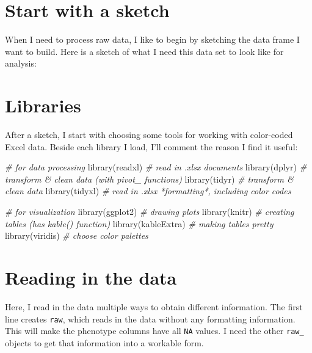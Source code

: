 \documentclass[
]{book}
\newenvironment{Shaded}{\begin{snugshade}}{\end{snugshade}}
\newcommand{\CommentTok}[1]{\textcolor[rgb]{0.56,0.35,0.01}{\textit{#1}}}
\newcommand{\FunctionTok}[1]{\textcolor[rgb]{0.00,0.00,0.00}{#1}}
\newcommand{\NormalTok}[1]{#1}
\begin{document}
\hypertarget{start-with-a-sketch}{%
\section{Start with a sketch}\label{start-with-a-sketch}}

When I need to process raw data, I like to begin by sketching the data frame I want to build. Here is a sketch of what I need this data set to look like for analysis:

\hypertarget{libraries}{%
\section{Libraries}\label{libraries}}

After a sketch, I start with choosing some tools for working with color-coded Excel data. Beside each library I load, I'll comment the reason I find it useful:

\begin{Shaded}
\begin{Highlighting}[]
\CommentTok{\# for data processing }
\FunctionTok{library}\NormalTok{(readxl) }\CommentTok{\# read in .xlsx documents }
\FunctionTok{library}\NormalTok{(dplyr) }\CommentTok{\# transform \& clean data (with \textquotesingle{}pivot\_\textquotesingle{} functions)}
\FunctionTok{library}\NormalTok{(tidyr) }\CommentTok{\# transform \& clean data }
\FunctionTok{library}\NormalTok{(tidyxl) }\CommentTok{\# read in .xlsx *formatting*, including color codes}

\CommentTok{\# for visualization }
\FunctionTok{library}\NormalTok{(ggplot2) }\CommentTok{\# drawing plots }
\FunctionTok{library}\NormalTok{(knitr) }\CommentTok{\# creating tables (has \textquotesingle{}kable()\textquotesingle{} function)}
\FunctionTok{library}\NormalTok{(kableExtra) }\CommentTok{\# making tables pretty }
\FunctionTok{library}\NormalTok{(viridis) }\CommentTok{\# choose color palettes}
\end{Highlighting}
\end{Shaded}

\hypertarget{reading-in-the-data}{%
\section{Reading in the data}\label{reading-in-the-data}}

Here, I read in the data multiple ways to obtain different information. The first line creates \texttt{raw}, which reads in the data without any formatting information. This will make the phenotype columns have all \texttt{NA} values. I need the other \texttt{raw\_} objects to get that information into a workable form.
\end{document}
